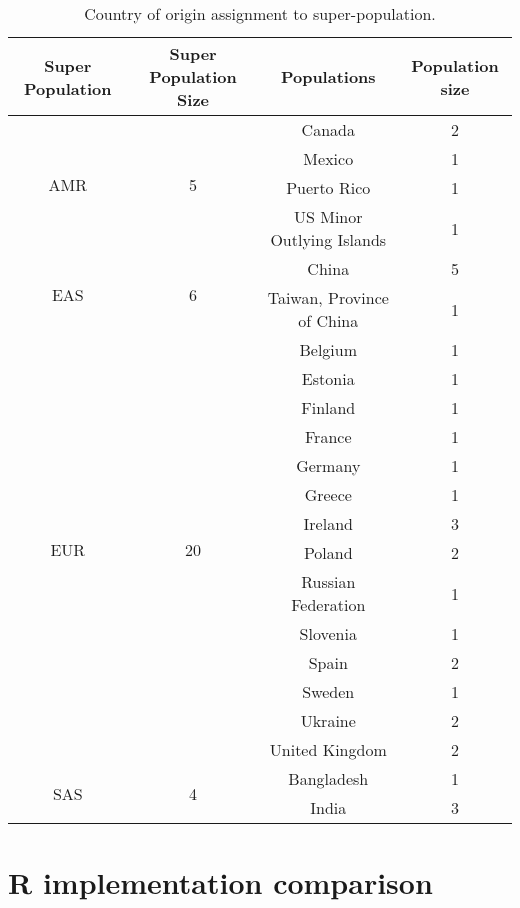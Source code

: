 \documentclass{bmcart}
\begin{document}
\label{pgppops}
\begin{table}[h!]
\caption{Country of origin assignment to super-population.}
      \begin{tabular}{|c|c|c|c|}
\hline
Super Population		&	Super Population Size &	Populations	&	Population size \\
\hline
\multirow{4}{*}{AMR} 	&	\multirow{4}{*}{5}	&	Canada	&	2	\\
					&					&	Mexico	&	1	\\
					&					&	Puerto Rico               & 1               \\
					&					&	US Minor Outlying Islands & 1               \\
					\hline
\multirow{2}{*}{EAS}		&	\multirow{2}{*}{6}	&	China                     & 5               \\
					&					&	Taiwan, Province of China & 1	\\
					\hline
\multirow{14}{*}{EUR}	&	\multirow{14}{*}{20}	& Belgium				& 1	\\
					&					& Estonia				& 1	\\
					&					& Finland				& 1	\\
					&					& France				& 1	\\
					&					& Germany			& 1	\\
					&					& Greece				& 1	\\
					&					& Ireland				& 3	\\
					&					& Poland				& 2	\\
					&					& Russian Federation	& 1	\\
					&					& Slovenia			& 1	\\
					&					& Spain				& 2	\\
					&					& Sweden				& 1	\\
					&					& Ukraine				& 2	\\
					&					& United Kingdom		& 2	\\
					\hline
\multirow{2}{*}{SAS}		&	\multirow{2}{*}{4}	& Bangladesh			& 1	\\
					&					& India				& 3        \\     
					\hline
      \end{tabular}
\end{table}

\newpage

\section{R implementation comparison}
\end{document}

